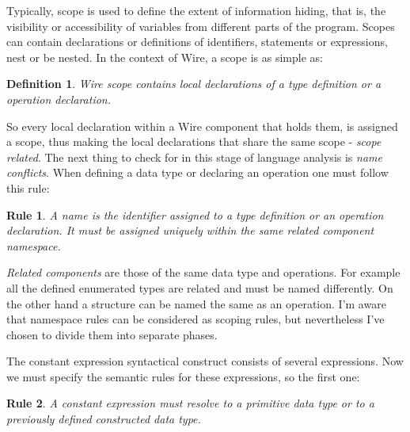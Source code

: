 \documentclass[times, utf8, diplomski]{fer}
\newtheorem{wirerule}{Rule}
\newtheorem{wiredef}{Definition}
\begin{document}
Typically, scope is used to define the extent of information hiding, that is, 
the visibility or accessibility of variables from different parts of the program. 
Scopes can contain declarations or definitions of identifiers, statements or 
expressions, nest or be nested.
In the context of Wire, a scope is as simple as:
\begin{wiredef}
Wire scope contains local declarations of a type definition or a operation declaration.
\end{wiredef}

So every local declaration within a Wire component that holds them, is assigned 
a scope, thus making the local declarations that share the same scope - 
\emph{scope related}.
The next thing to check for in this stage of language analysis is \emph{name conflicts}.
When defining a data type or declaring an operation one must follow this rule:
\begin{wirerule}
A name is the identifier assigned to a type definition or an operation declaration. 
It must be assigned uniquely within the same related component namespace.
\end{wirerule}
\emph{Related components} are those of the same data type and operations. 
For example all the defined enumerated types are related and must be named 
differently. On the other hand a structure can be named the same as an operation.
I'm aware that namespace rules can be considered as scoping rules, 
but nevertheless I've chosen to divide them into separate phases.

The constant expression syntactical construct consists of several expressions. 
Now we must specify the semantic rules for these expressions, so the first one:
\begin{wirerule}
A constant expression must resolve to a primitive data type or to a previously 
defined constructed data type.
\end{wirerule}
\end{document}
